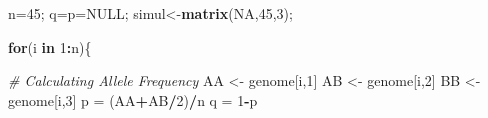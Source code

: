 \documentclass[]{article}
\newenvironment{Shaded}{\begin{snugshade}}{\end{snugshade}}
\newcommand{\KeywordTok}[1]{\textcolor[rgb]{0.13,0.29,0.53}{\textbf{#1}}}
\newcommand{\DecValTok}[1]{\textcolor[rgb]{0.00,0.00,0.81}{#1}}
\newcommand{\StringTok}[1]{\textcolor[rgb]{0.31,0.60,0.02}{#1}}
\newcommand{\CommentTok}[1]{\textcolor[rgb]{0.56,0.35,0.01}{\textit{#1}}}
\newcommand{\OtherTok}[1]{\textcolor[rgb]{0.56,0.35,0.01}{#1}}
\newcommand{\ControlFlowTok}[1]{\textcolor[rgb]{0.13,0.29,0.53}{\textbf{#1}}}
\newcommand{\OperatorTok}[1]{\textcolor[rgb]{0.81,0.36,0.00}{\textbf{#1}}}
\newcommand{\NormalTok}[1]{#1}
\begin{document}
\begin{Shaded}
\begin{Highlighting}[]
\NormalTok{n=}\DecValTok{45}\NormalTok{; q=p=}\OtherTok{NULL}\NormalTok{; simul<-}\KeywordTok{matrix}\NormalTok{(}\OtherTok{NA}\NormalTok{,}\DecValTok{45}\NormalTok{,}\DecValTok{3}\NormalTok{); }

\ControlFlowTok{for}\NormalTok{(i }\ControlFlowTok{in} \DecValTok{1}\OperatorTok{:}\NormalTok{n)\{}
  
  \CommentTok{# Calculating Allele Frequency}
\NormalTok{  AA <-}\StringTok{ }\NormalTok{genome[i,}\DecValTok{1}\NormalTok{]}
\NormalTok{  AB <-}\StringTok{ }\NormalTok{genome[i,}\DecValTok{2}\NormalTok{]}
\NormalTok{  BB <-}\StringTok{ }\NormalTok{genome[i,}\DecValTok{3}\NormalTok{]}
\NormalTok{  p =}\StringTok{ }\NormalTok{(AA}\OperatorTok{+}\NormalTok{AB}\OperatorTok{/}\DecValTok{2}\NormalTok{)}\OperatorTok{/}\NormalTok{n}
\NormalTok{  q =}\StringTok{ }\DecValTok{1}\OperatorTok{-}\NormalTok{p}
  

\end{Highlighting}
\end{Shaded}
\end{document}

